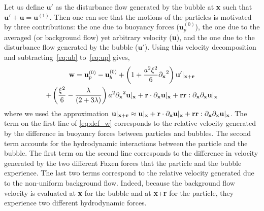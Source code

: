 Let us define $\textbf{u}'$ as the disturbance flow generated by the bubble at \textbf{x} such that $\textbf{u}'+\textbf{u} = \textbf{u}^{(1)}$.
Then one can see that the motions of the particles is motivated by three contributions: the one due to buoyancy forces ($\textbf{u}_p^{(0)}$), the one due to the averaged (or background flow) yet arbitrary velocity (\textbf{u}), and the one due to the disturbance flow generated by the bubble ($\textbf{u}'$). 
Using this velocity decomposition and subtracting~\eqref{eq:ub} to~\eqref{eq:up} gives, 
\begin{multline}
    \textbf{w}
    =
    \textbf{u}_p^{(0)} - \textbf{u}_b^{(0)}
    + \left(1 +\frac{a^2\xi^2}{6} \pddx^2\right) \textbf{u}'|_{\textbf{x}+\textbf{r}}\\
    + \left(\frac{\xi^2}{6} - \frac{\lambda}{(2+3\lambda)}\right) a^2 \pddx^2 \textbf{u}|_{\textbf{x}}
    + \textbf{r} \cdot \pddx \textbf{u}|_{\textbf{x}}+ \textbf{rr}: \pddx\pddx \textbf{u}|_{\textbf{x}}
    \label{eq:def_w}
\end{multline}
where we used the approximation $\textbf{u}|_{\textbf{x}+\textbf{r}} \approx \textbf{u}|_{\textbf{x}} + \textbf{r} \cdot {\partial_\textbf{x}} \textbf{u}|_{\textbf{x}}+ \textbf{rr}: {\partial_\textbf{x}}{\partial_\textbf{x}} \textbf{u}|_{\textbf{x}}$.
The term on the first line of \eqref{eq:def_w} corresponds to the relative velocity generated by the difference in buoyancy forces between particles and bubbles.
The second term accounts for the hydrodynamic interactions between the particle and the bubble. 
The first term on the second line corresponds to the difference in velocity generated by the two different Faxen forces that the particle and the bubble experience. 
The last two terms correspond to the relative velocity generated due to the non-uniform background flow. 
Indeed, because the background flow velocity is evaluated at \textbf{x} for the bubble and at \textbf{x}+\textbf{r} for the particle, they experience two different hydrodynamic forces.
 
